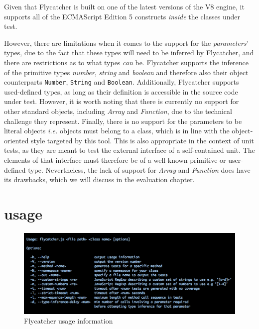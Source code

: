 Given that \textsf{Flycatcher} is built on one of the latest versions of the V8 engine, it supports all of the ECMAScript Edition 5 constructs \emph{inside} the classes under test.

However, there are limitations when it comes to the support for the \emph{parameters}' types, due to the fact that these types will need to be inferred by \textsf{Flycatcher}, and there are restrictions as to what types \emph{can} be. Flycatcher supports the inference of the primitive types \emph{number}, \emph{string} and \emph{boolean} and therefore also their object counterparts \texttt{Number}, \texttt{String} and \texttt{Boolean}. Additionally, \textsf{Flycatcher} supports used-defined types, as long as their definition is accessible in the source code under test. However, it is worth noting that there is currently no support for other standard objects, including \textit{Array} and \textit{Function}, due to the technical challenge they represent. Finally, there is no support for the parameters to be literal objects \emph{i.e.} objects must belong to a class, which is in line with the object-oriented style targeted by this tool. This is also appropriate in the context of unit tests, as they are meant to test the external interface of a self-contained unit. The elements of that interface must therefore be of a well-known primitive or user-defined type. Nevertheless, the lack of support for \textit{Array} and \textit{Function} does have its drawbacks, which we will discuss in the evaluation chapter.

\section{\textsf{} usage}
\label{usagesection}
\begin{figure}[h]
\hspace*{-1.6cm}
\centering
\includegraphics[scale=0.45]{./components/chapter3/usage.png}
\caption{\textsf{Flycatcher} usage information}
\label{usage}
\end{figure}

